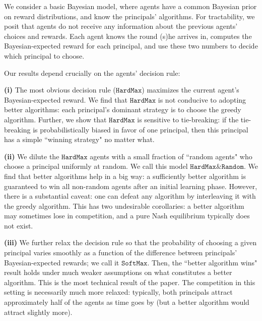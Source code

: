 \documentclass[10pt]{article}
\newcommand{\TheoryModel}{Bayesian-choice model\xspace}
\newcommand{\term}[1]{\ensuremath{\mathtt{#1}}\xspace}
\newcommand{\HardMax}{\term{HardMax}}
\newcommand{\HardMaxRandom}{\term{HardMax\&Random}}
\newcommand{\SoftMaxRandom}{\term{SoftMax}}
\begin{document}


We consider a basic Bayesian model, where agents have a common Bayesian prior on reward distributions, and know the principals' algorithms. For tractability, we posit that agents do not receive any information about the previous agents' choices and rewards. Each agent knows the round (s)he arrives in, computes the Bayesian-expected reward for each principal, and use these two numbers to decide which principal to choose.

Our results depend crucially on the agents' decision rule:

\textbf{(i)}
The most obvious decision rule (\HardMax) maximizes the current agent's Bayesian-expected reward. We find that \HardMax is not conducive to adopting better algorithms: each principal's dominant strategy is to choose the greedy algorithm. Further, we show that \HardMax is sensitive to tie-breaking: if the tie-breaking is probabilistically biased in favor of one principal, then this principal has a simple ``winning strategy" no matter what.

\textbf{(ii)}
We dilute the \HardMax agents with a small fraction of ``random agents" who choose a principal uniformly at random. We call this model \HardMaxRandom. We find that better algorithms help in a big way: a sufficiently better algorithm is guaranteed to win all non-random agents after an initial learning phase. However, there is a substantial caveat: one can defeat any algorithm by interleaving it with the greedy algorithm. This has two undesirable corollaries: a better algorithm may sometimes lose in competition, and a pure Nash equilibrium typically does not exist.

\textbf{(iii)}
We further relax the decision rule so that the probability of choosing a given principal varies smoothly as a function of the difference between  principals' Bayesian-expected rewards; we call it \SoftMaxRandom. Then, the ``better algorithm wins" result holds under much weaker assumptions on what constitutes a better algorithm. This is the most technical result of the paper. The competition in this setting is necessarily much more relaxed: typically, both principals attract approximately half of the agents as time goes by (but a better algorithm would attract slightly more).
\end{document}
